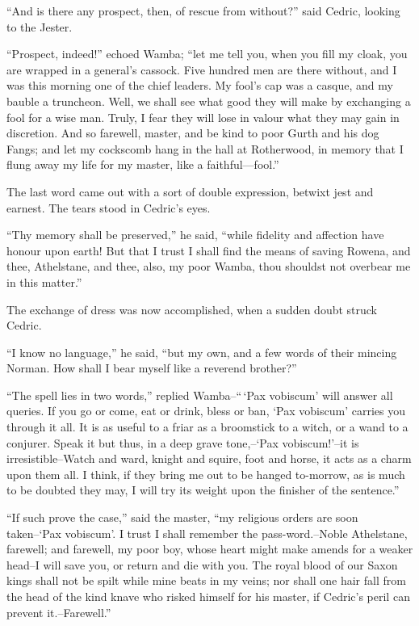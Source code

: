``And is there any prospect, then, of rescue from without?'' said
Cedric, looking to the Jester.

``Prospect, indeed!'' echoed Wamba; ``let me tell you, when you fill my
cloak, you are wrapped in a general's cassock. Five hundred men are
there without, and I was this morning one of the chief leaders. My
fool's cap was a casque, and my bauble a truncheon. Well, we shall see
what good they will make by exchanging a fool for a wise man. Truly, I
fear they will lose in valour what they may gain in discretion. And so
farewell, master, and be kind to poor Gurth and his dog Fangs; and let
my cockscomb hang in the hall at Rotherwood, in memory that I flung away
my life for my master, like a faithful---fool.''

The last word came out with a sort of double expression, betwixt jest
and earnest. The tears stood in Cedric's eyes.

``Thy memory shall be preserved,'' he said, ``while fidelity and
affection have honour upon earth! But that I trust I shall find the
means of saving Rowena, and thee, Athelstane, and thee, also, my poor
Wamba, thou shouldst not overbear me in this matter.''

The exchange of dress was now accomplished, when a sudden doubt struck
Cedric.

``I know no language,'' he said, ``but my own, and a few words of their
mincing Norman. How shall I bear myself like a reverend brother?''

``The spell lies in two words,'' replied Wamba--``\,`Pax vobiscum' will
answer all queries. If you go or come, eat or drink, bless or ban, `Pax
vobiscum' carries you through it all. It is as useful to a friar as a
broomstick to a witch, or a wand to a conjurer. Speak it but thus, in a
deep grave tone,--`Pax vobiscum!'--it is irresistible--Watch and ward,
knight and squire, foot and horse, it acts as a charm upon them all. I
think, if they bring me out to be hanged to-morrow, as is much to be
doubted they may, I will try its weight upon the finisher of the
sentence.''

``If such prove the case,'' said the master, ``my religious orders are
soon taken--`Pax vobiscum'. I trust I shall remember the
pass-word.--Noble Athelstane, farewell; and farewell, my poor boy, whose
heart might make amends for a weaker head--I will save you, or return
and die with you. The royal blood of our Saxon kings shall not be spilt
while mine beats in my veins; nor shall one hair fall from the head of
the kind knave who risked himself for his master, if Cedric's peril can
prevent it.--Farewell.''

